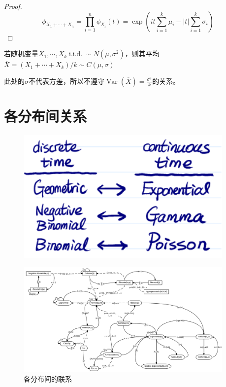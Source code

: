 \begin{proof}
    \[ \phi_{X_1+\cdots+ X_n} = \prod_{i=1}^n \phi_{X_i}(t)=\exp (it\sum_{i=1}^k\mu_i - |t|\sum_{i=1}^k \sigma_i) \]
\end{proof}

\begin{corollary}
    若随机变量$X_1,\cdots ,X_k \operatorname{i.i.d.} \sim N(\mu,\sigma^2)$，则其平均$\overline{X}=(X_1+\cdots +X_k)/k \sim C(\mu,\sigma)$
\end{corollary}

\begin{remark}
    此处的$\sigma$不代表方差，所以不遵守$\operatorname{Var}(\overline{X})=\frac{\sigma^2}{k}$的关系。
\end{remark}

\section{各分布间关系}

\begin{figure}[hp]
    \centering\includegraphics[width=0.95\textwidth]{image/relationship.png}
\end{figure}

\begin{figure}[hp]
    \centering\includegraphics[width=0.95\textwidth]{image/Relationships_among_some_of_univariate_probability_distributions.jpg}
    \caption{各分布间的联系}
    \label{fig:relationship_among_univariate_distributions}
\end{figure}